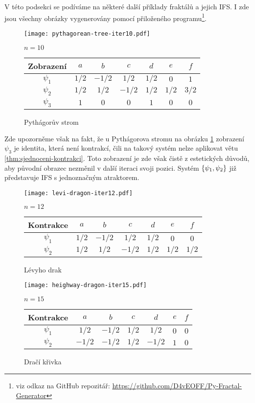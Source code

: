 V této podsekci se podíváme na některé další příklady fraktálů a jejich IFS. I zde jsou všechny obrázky vygenerovány pomocí přiloženého programu\footnote{viz odkaz na GitHub repozitář: \url{https://github.com/D4vEOFF/Py-Fractal-Generator}}.
\begin{figure}[H]
    \centering
    \texttt{[image: pythagorean-tree-iter10.pdf]}
    \begin{center}
        $n=10$
    \end{center}
    \begin{tabular}{c|cccccc}
    Zobrazení   & $a$   & $b$   & $c$   & $d$   & $e$   & $f$          \\\hline
    $\psi_1$    & $1/2$ & $-1/2$ & $1/2$ & $1/2$ & $0$   & $1$         \\
    $\psi_2$    & $1/2$ & $1/2$ & $-1/2$ & $1/2$ & $1/2$ & $3/2$         \\
    $\psi_3$    & $1$   & $0$   & $0$   & $1$   & $0$   & $0$         \\
    \end{tabular}
    \caption{Pythágorův strom}
    \label{fig:pythagoruv-strom}
\end{figure}
Zde upozorněme však na fakt, že u Pythágorova stromu na obrázku \ref{fig:pythagoruv-strom} zobrazení $\psi_3$ je identita, která není kontrakcí, čili na takový systém nelze aplikovat větu \ref{thm:sjednoceni-kontrakci}. Toto zobrazení je zde však čistě z estetických důvodů, aby původní obrazec nezměnil v další iteraci svoji pozici. Systém $\left\{\psi_1,\psi_2\right\}$ již představuje IFS s jednoznačným atraktorem.
\begin{figure}[H]
    \centering
    \texttt{[image: levi-dragon-iter12.pdf]}
    \begin{center}
        $n=12$
    \end{center}
    \begin{tabular}{c|cccccc}
    Kontrakce   & $a$   & $b$   & $c$   & $d$   & $e$   & $f$          \\\hline
    $\psi_1$    & $1/2$ & $-1/2$ & $1/2$ & $1/2$ & $0$   & $0$         \\
    $\psi_2$    & $1/2$ & $1/2$ & $-1/2$ & $1/2$ & $1/2$ & $1/2$
    \end{tabular}
    \caption{Lévyho drak}
    \label{fig:levyho-drak}
\end{figure}
\begin{figure}[H]
    \centering
    \texttt{[image: heighway-dragon-iter15.pdf]}
    \begin{center}
        $n=15$
    \end{center}
    \begin{tabular}{c|cccccc}
    Kontrakce   & $a$   & $b$   & $c$   & $d$   & $e$   & $f$          \\\hline
    $\psi_1$    & $1/2$ & $-1/2$ & $1/2$ & $1/2$ & $0$   & $0$         \\
    $\psi_2$    & $-1/2$ & $-1/2$ & $1/2$ & $-1/2$ & $1$ & $0$
    \end{tabular}
    \caption{Dračí křivka}
    \label{fig:draci-krivka}
\end{figure}
